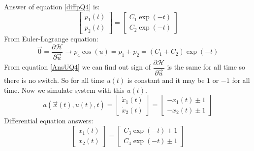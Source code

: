Answer of equation \ref{diffpQ4} is:
\begin{equation}\label{SolvepQ4}
	\begin{bmatrix}
		p_1(t)\\
		p_2(t)
	\end{bmatrix} = \begin{bmatrix}
	C_1\exp(-t)\\
	C_2\exp(-t)
	\end{bmatrix} 
\end{equation}
From Euler-Lagrange equation:
\begin{equation}\label{AnsUQ4}
	{\vec{0}} = \dfrac{\partial \mathcal{H} }{\partial \vec{u}} \to 
	p_4\cos(u) = p_1 + p_2 = \left(  C_1 + C_2  \right)\exp(-t)
\end{equation}
From equation \ref{AnsUQ4} we can find out sign of $\dfrac{\partial \mathcal{H} }{\partial \vec{u}}$ is the same for all time so there is no switch. So for all time $u(t)$ is constant and it may be $1$ or $-1$ for all time. Now we simulate system with this $u(t)$.
\begin{equation}
	a(\vec x(t), u(t), t) = 
	\begin{bmatrix}
		\dot x_1(t) \\
		\dot x_2(t)
	\end{bmatrix}
	= 
	\begin{bmatrix}
		-x_1(t) \pm 1 \\
		-x_2(t)  \pm 1
	\end{bmatrix}
\end{equation}
Differential equation answers:
\begin{equation}
	\begin{bmatrix}
		x_1(t) \\
		x_2(t)
	\end{bmatrix}
	= 
	\begin{bmatrix}
		C_3\exp(-t) \pm 1 \\
		C_4\exp(-t)  \pm 1
	\end{bmatrix}
\end{equation}
